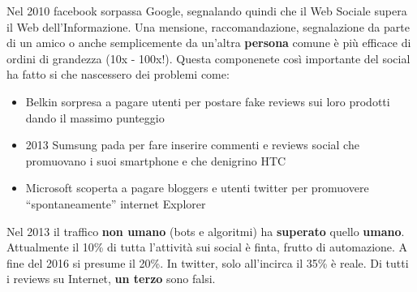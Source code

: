 Nel 2010 facebook sorpassa Google, segnalando quindi che il Web Sociale supera il Web dell'Informazione. Una mensione, raccomandazione, segnalazione da parte di un amico o anche semplicemente da un'altra \textbf{persona} comune \`e pi\`u efficace di ordini di grandezza (10x - 100x!). Questa componenete così importante del social ha fatto si che nascessero dei problemi come:
\begin{itemize}

\item Belkin sorpresa a pagare utenti per postare fake reviews sui loro prodotti dando il massimo punteggio
\item 2013 Sumsung pada per fare inserire commenti e reviews social che promuovano i suoi smartphone e che denigrino HTC
\item Microsoft scoperta a pagare bloggers e utenti twitter per promuovere ``spontaneamente'' internet Explorer

\end{itemize}


Nel 2013 il traffico \textbf{non umano} (bots e algoritmi) ha \textbf{superato} quello \textbf{umano}. Attualmente il 10\% di tutta l'attivit\`a sui social \`e finta, frutto di automazione. A fine del 2016 si presume il 20\%. In twitter, solo all'incirca il 35\% \`e reale. Di tutti i reviews su Internet, \textbf{un terzo} sono falsi.

